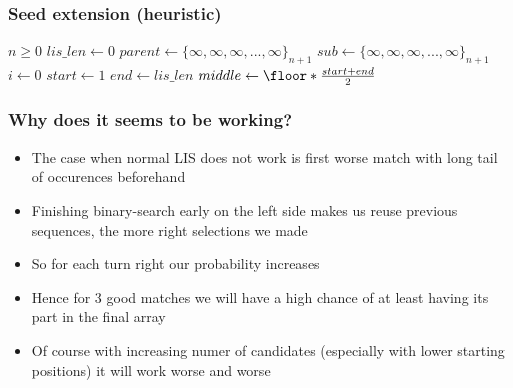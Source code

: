 \begin{frame}
  \frametitle{Seed extension (heuristic)}
  
  \begin{algorithm}[H]
      \captionsetup{font=scriptsize}
      \caption{Segmented-LIS heuristic O(n log n)}\label{alg:cap}
      \tiny
      \begin{algorithmic}
          \Require $n \geq 0$
          \State $lis\_len \gets 0$ 
          \State $parent \gets \{\infty, \infty, \infty, ..., \infty\}_{n+1}$ 
          \State $sub \gets \{\infty, \infty, \infty, ..., \infty\}_{n+1}$ 
          \State $i \gets 0$
           
              \State $start \gets 1$
              \State $end \gets lis\_len$
               
                  \State $middle \gets \floor*{\frac{start + end}{2}}$
                   
                       
                  \Else
                  \EndIf
              \EndWhile
               
              \EndIf
          \EndWhile
      \end{algorithmic}
  \end{algorithm}
\end{frame}

\begin{frame}
  \frametitle{Why does it seems to be working?}

  \begin{itemize}
    \item The case when normal LIS does not work is first worse match with long tail of occurences beforehand
    \item Finishing binary-search early on the left side makes us reuse previous sequences, the more right selections we made
    \item So for each turn right our probability increases
    \item Hence for 3 good matches we will have a high chance of at least having its part in the final array
    \item Of course with increasing numer of candidates (especially with lower starting positions) it will work worse and worse
  \end{itemize}
\end{frame}

